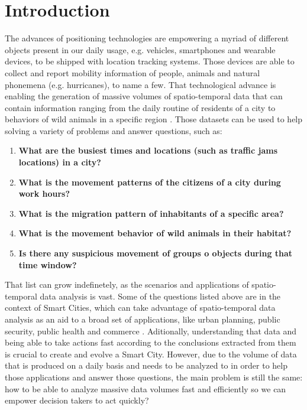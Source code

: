 \chapter{Introduction}
\label{chp:introduction}
The advances of positioning technologies are empowering a myriad of different objects present in our daily usage, e.g.
vehicles, smartphones and wearable devices, to be shipped with location tracking systems. Those devices are able to
collect and report mobility information of people, animals and natural phonemena (e.g. hurricanes), to name a few. That
technological advance is enabling the generation of massive volumes of spatio-temporal data that can contain information
ranging from the daily routine of residents of a city \citep{whatdidyoudo} to behaviors of wild animals in a specific
region \citep{trajclustering}\citep{miningperiodic}. Those datasets can be used to help solving a variety of problems
and answer questions, such as:

\begin{enumerate}
    \item \textbf{What are the busiest times and locations (such as traffic jams locations) in a city?}
        \citep{visualtrafficjam}
    \item \textbf{What is the movement patterns of the citizens of a city during work hours?}
    \item \textbf{What is the migration pattern of inhabitants of a specific area?}
    \item \textbf{What is the movement behavior of wild animals in their habitat?} \citep{movemine}
    \item \textbf{Is there any suspicious movement of groups o objects during that time window?}
\end{enumerate}

That list can grow indefinetely, as the scenarios and applications of spatio-temporal data analysis is vast.  Some of
the questions listed above are in the context of Smart Cities, which can take advantage of spatio-temporal data analysis
as an aid to a broad set of applications, like urban planning, public security, public health and commerce
\citep{ieeesmartcities}. Aditionally, understanding that data and being able to take actions fast according to the
conclusions extracted from them is crucial to create and evolve a Smart City. However, due to the volume of data that is
produced on a daily basis and needs to be analyzed to in order to help those applications and answer those questions,
the main problem is still the same: how to be able to analyze massive data volumes fast and efficiently so we can
empower decision takers to act quickly?

